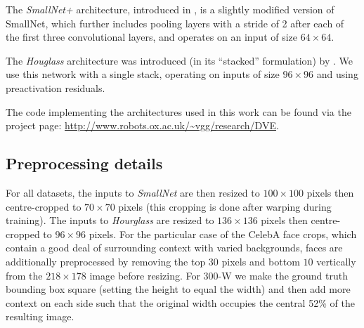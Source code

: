 \documentclass[10pt,twocolumn,letterpaper]{article}
\begin{document}
The \textit{SmallNet+} architecture, introduced in \cite{thewlis17unsupervised}, is a slightly modified version of SmallNet, which further includes pooling layers with a stride of 2 after each of the first three convolutional layers, and operates on an input of size $64 \times 64$.

The \textit{Houglass} architecture was introduced (in its ``stacked'' formulation) by \cite{newell2016stacked}.  We use this network with a single stack, operating on inputs of size $96 \times 96$ and using preactivation residuals.  

The code implementing the architectures used in this work can be found via the project page: \url{http://www.robots.ox.ac.uk/~vgg/research/DVE}.

\subsection{Preprocessing details}

For all datasets, the inputs to \textit{SmallNet} are then resized to $100\times100$ pixels then centre-cropped to $70\times70$ pixels (this cropping is done after warping during training).  The inputs to \textit{Hourglass} are resized to $136\times136$ pixels then centre-cropped to $96\times96$ pixels.  For the particular case of the CelebA face crops, which contain a good deal of surrounding context with varied backgrounds, faces are additionally preprocessed by removing the top $30$ pixels and bottom $10$ vertically from the $218\times178$ image before resizing. For 300-W we make the ground truth bounding box square (setting the height to equal the width) and then add more context on each side such that the original width occupies the central 52\% of the resulting image.
 
\end{document}
